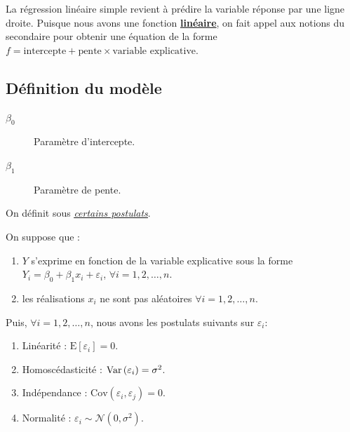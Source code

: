 \documentclass[french]{article}
\begin{document}
\begin{multicols*}{2}
\bigskip

\begin{rappel_enhanced}[Contexte]
La régression linéaire simple revient à prédire la variable réponse par une ligne droite. Puisque nous avons une fonction \underline{\textbf{linéaire}}, on fait appel aux notions du secondaire pour obtenir une équation de la forme $f = \text{intercepte} + \text{pente} \times \text{variable explicative}$.
\end{rappel_enhanced}



\columnbreak
\subsection{Définition du modèle}
\begin{distributions}[Notation]
\begin{description}
	\item[$\beta_{0}$]	Paramètre d'intercepte.
	\item[$\beta_{1}$]	Paramètre de pente.
\end{description}
\end{distributions}

\begin{definitionNOHFILL}
On définit  sous \textit{\color{bleudefrance}\underline{\hyperlink{postulatsSLR}{\color{bleudefrance} certains postulats}}}.
\end{definitionNOHFILL}

\begin{definitionNOHFILLprop}
On suppose que : 
\begin{enumerate}
	\item	$Y$ s'exprime en fonction de la variable explicative sous la forme $Y_{i} = \beta_{0} + \beta_{1}x_{i} + \varepsilon_{i}$, $\forall i = 1, 2, \dots, n$.
	\item	les réalisations $x_{i}$ ne sont pas aléatoires $\forall i = 1, 2, \dots, n$.
\end{enumerate}

\bigskip

Puis, $\forall i = 1, 2, \dots, n$, nous avons les postulats suivants sur $\varepsilon_{i}$: 
\begin{enumerate}[label = $\mathbf{H}_{\arabic*}$]
	\item Linéarité : $\text{E}[\varepsilon_{i}] = 0$.
	\item Homoscédasticité : $\mathrm{Var} \left( \varepsilon_i \right)= \sigma^2$.
	\item Indépendance : $\text{Cov}(\varepsilon_{i}, \varepsilon_{j}) = 0$.
	\item Normalité : $\varepsilon_{i} \sim \mathcal{N}(0, \sigma^{2})$.
\end{enumerate}


\end{definitionNOHFILLprop}
\end{multicols*}
\end{document}

